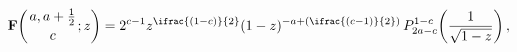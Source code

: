\[\mathop{\mathbf{F}\/}\nolimits\!\left({a,a+\tfrac{1}{2}\atop c};z\right)=2^{c-%
1}z^{\ifrac{(1-c)}{2}}(1-z)^{-a+(\ifrac{(c-1)}{2})}\*\mathop{P^{1-c}_{2a-c}\/}%
\nolimits\!\left(\frac{1}{\sqrt{1-z}}\right),\]